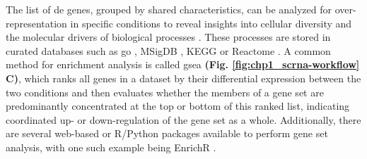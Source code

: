 \par The list of \gls{de} genes, grouped by shared characteristics, can be analyzed for over-representation in specific conditions to reveal insights into cellular diversity and the molecular drivers of biological processes \textbf{\cite{lueckenmalte_d_current_2019}}. These processes are stored in curated databases such as \gls{go} \textbf{\cite{ashburner_gene_2000}}, MSigDB \textbf{\cite{subramanian_gene_2005,liberzon_molecular_2011,castanza_extending_2023}}, KEGG \textbf{\cite{kanehisa_kegg_2017}} or Reactome \textbf{\cite{gillespie_reactome_2022}}. A common method for enrichment analysis is called \gls{gsea} \textbf{(Fig. \ref{fig:chp1_scrna-workflow} C)}\textbf{\cite{heumos_best_2023,subramanian_gene_2005,korotkevich_fast_2021}}, which ranks all genes in a dataset by their differential expression between the two conditions and then evaluates whether the members of a gene set are predominantly concentrated at the top or bottom of this ranked list, indicating coordinated up- or down-regulation of the gene set as a whole. Additionally, there are several web-based or R/Python packages available to perform gene set analysis, with one such example being EnrichR \textbf{\cite{chen_enrichr_2013,kuleshov_enrichr_2016}}. 




